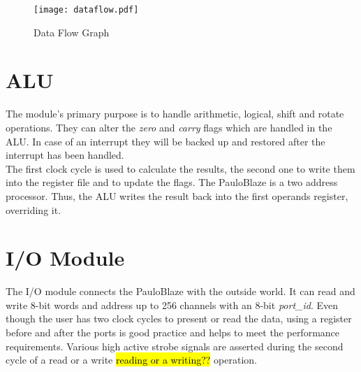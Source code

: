 \begin{figure}[h]
	\sffamily
\label{fig:dataflow}
\centering
\texttt{[image: dataflow.pdf]}
\caption{Data Flow Graph}
\end{figure}

\section{ALU}
\label{sec:alu}
The module's primary purpose is to handle arithmetic, logical, shift and rotate operations.
They can alter the \emph{zero} and \emph{carry} flags which are handled in the ALU.
In case of an interrupt they will be backed up and restored after the interrupt has been handled.
\\
The first clock cycle is used to calculate the results, the second one to write them into the register file and to update the flags.
The PauloBlaze is a two address processor.
Thus, the ALU writes the result back into the first operands register, overriding it.

\section{I/O Module}
\label{sec:io}
The I/O module connects the PauloBlaze with the outside world.
It can read and write 8-bit words and address up to 256 channels with an 8-bit \emph{port\_id}.
Even though the user has two clock cycles to present or read the data, using a register before and after the ports is good practice and helps to meet the performance requirements.
Various high active strobe signals are asserted during the second cycle of a read or a write \hl{reading or a writing??} operation.
